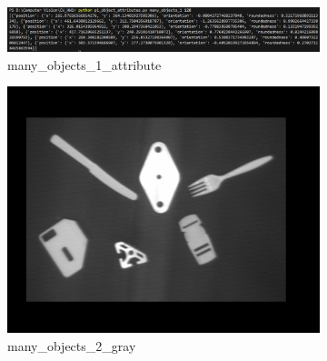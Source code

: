\documentclass[bwprint]{gmcmthesis}
\numberwithin{figure}{section}
\begin{document}
\begin{enumerate}[label=\alph*.]
\begin{figure}[h]
\begin{subfigure}[b]{0.3\textwidth}
        \end{subfigure}
        \newline
        \begin{subfigure}[b]{\textwidth}
            \centering
            \includegraphics[width=\textwidth]{../output/many_objects_1_attribute.png}
            \caption{many\_objects\_1\_attribute}
            \label{fig:subfigure4}
        \end{subfigure}
        \newline

        \centering
        \begin{subfigure}[b]{0.3\textwidth}
            \centering
            \includegraphics[width=\textwidth]{../output/many_objects_2_gray.png}
            \caption{many\_objects\_2\_gray}
            \label{fig:subfigure5}
        \end{subfigure}
        \hfill
        \begin{subfigure}[b]{0.3\textwidth}
            \centering

\end{subfigure}
\end{figure}
\end{enumerate}
\end{document}
